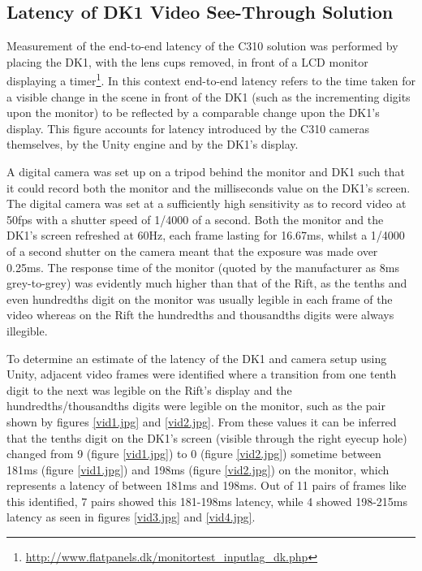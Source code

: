 
\subsection{Latency of DK1 Video See-Through Solution}

Measurement of the end-to-end latency of the C310 solution was performed by placing the DK1, with the lens cups removed, in front of a LCD monitor displaying a timer\footnote{\url{http://www.flatpanels.dk/monitortest_inputlag_dk.php}}. In this context end-to-end latency refers to the time taken for a visible change in the scene in front of the DK1 (such as the incrementing digits upon the monitor) to be reflected by a comparable change upon the DK1's display. This figure accounts for latency introduced by the C310 cameras themselves, by the Unity engine and by the DK1's display.

A digital camera was set up on a tripod behind the monitor and DK1 such that it could record both the monitor and the milliseconds value on the DK1's screen. The digital camera was set at a sufficiently high sensitivity as to record video at 50fps with a shutter speed of 1/4000 of a second. Both the monitor and the DK1's screen refreshed at 60Hz, each frame lasting for 16.67ms, whilst a 1/4000 of a second shutter on the camera meant that the exposure was made over 0.25ms. The response time of the monitor (quoted by the manufacturer as 8ms grey-to-grey) was evidently much higher than that of the Rift, as the tenths and even hundredths digit on the monitor was usually legible in each frame of the video whereas on the Rift the hundredths and thousandths digits were always illegible.

To determine an estimate of the latency of the DK1 and camera setup using Unity, adjacent video frames were identified where a transition from one tenth digit to the next was legible on the Rift's display and the hundredths/thousandths digits were legible on the monitor, such as the pair shown by figures \ref{vid1.jpg} and \ref{vid2.jpg}. From these values it can be inferred that the tenths digit on the DK1's screen (visible through the right eyecup hole) changed from 9 (figure \ref{vid1.jpg}) to 0 (figure \ref{vid2.jpg}) sometime between 181ms (figure \ref{vid1.jpg}) and 198ms (figure \ref{vid2.jpg}) on the monitor, which represents a latency of between 181ms and 198ms. Out of 11 pairs of frames like this identified, 7 pairs showed this 181-198ms latency, while 4 showed 198-215ms latency as seen in figures \ref{vid3.jpg} and \ref{vid4.jpg}.

